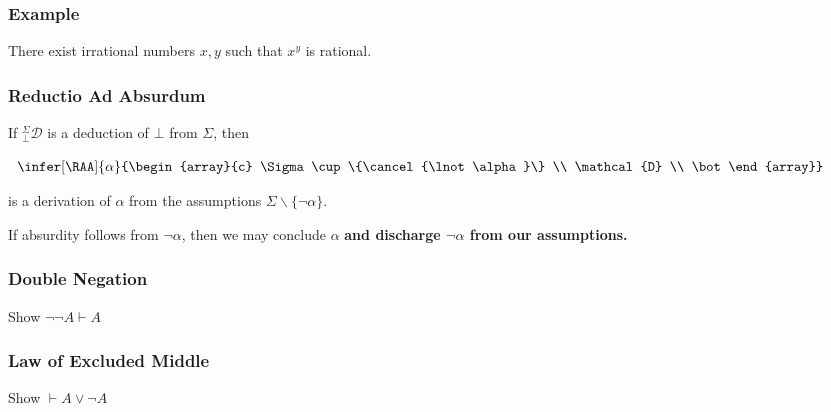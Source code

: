 \documentclass{beamer}
\begin{document}
\begin{frame}
	\frametitle{Example}

	There exist irrational numbers $x,y$ such that $x^{y}$ is rational.

	\vspace{70mm}

\end{frame}

\begin{frame}
	\frametitle{Reductio Ad Absurdum}
	
	If $^{\Sigma}_{\bot}\mathcal{D}$ is a deduction of $\bot$ from $\Sigma$, then
	
	\begin{center}		
		$\begin{array}{c}		
		\infer[\RAA]{\alpha}
		{\begin{array}{c} \Sigma \cup \{\cancel{\lnot\alpha}\} \\ \mathcal{D} \\ \bot \end{array}}
		\end{array}$
	\end{center}
	
	is a derivation of $\alpha$ from the assumptions $\Sigma \backslash\{\lnot\alpha\}$.
	
	\vspace{5mm}
	
	If absurdity follows from $\lnot\alpha$, then we may conclude $\alpha$ {\bf and discharge $\lnot \alpha$ from our assumptions.}
	 
\end{frame}

\begin{frame}
	\frametitle{Double Negation}	
	
	Show $\lnot\lnot A \vdash A$
	\vspace{7cm}	
	
\end{frame}

\begin{frame}
	\frametitle{Law of Excluded Middle}
	
	Show $\vdash A \lor \lnot A$
	\vspace{70mm}
	
\end{frame}
\end{document}
